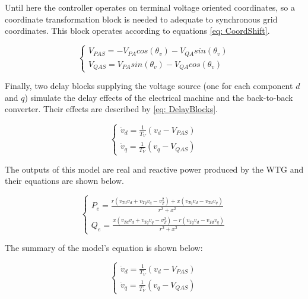 Until here the controller operates on terminal voltage oriented coordinates, so a coordinate transformation block is needed to adequate to synchronous grid coordinates. This block operates according to equations \eqref{eq: CoordShift}.

\begin{equation}
	\begin{cases}
		V_{PAS} = -V_{PA}cos(\theta_{v}) - V_{QA}sin(\theta_{v}) \\
		V_{QAS} = V_{PA}sin(\theta_{v}) - V_{QA}cos(\theta_{v})
	\end{cases}
	\label{eq: CoordShift}
\end{equation}

Finally, two delay blocks supplying the voltage source (one for each component $d$ and $q$) simulate the delay effects of the electrical machine and the back-to-back converter. Their effects are described by \eqref{eq: DelayBlocks}.

\begin{equation}
	\begin{cases}
		\dot{v}_{d} = \frac{1}{T_{V}}(v_{d} - V_{PAS}) \\
		\dot{v}_{q} = \frac{1}{T_{V}}(v_{q} - V_{QAS})
	\end{cases}
	\label{eq: DelayBlocks}
\end{equation}

The outputs of this model are real and reactive power produced by the WTG and their equations are shown below.

\begin{equation}
	\begin{cases}
		P_{e} = \frac{r(v_{Td}v_{d} + v_{Tq}v_{q} - v_{T}^{2}) + x(v_{Tq}v_{d} - v_{Td}v_{q})}{r^{2} + x^{2}} \\
		Q_{e} = \frac{x(v_{Td}v_{d} + v_{Tq}v_{q} - v_{T}^{2}) - r(v_{Tq}v_{d} - v_{Td}v_{q})}{r^{2} + x^{2}}
	\end{cases}
	\label{eq: Outputs}
\end{equation}

The summary of the model's equation is shown below:

\begin{equation*}
	\begin{cases}
		\dot{v}_{d} = \frac{1}{T_{V}}(v_{d} - V_{PAS}) \\
		\dot{v}_{q} = \frac{1}{T_{V}}(v_{q} - V_{QAS})
	\end{cases}
\end{equation*}

